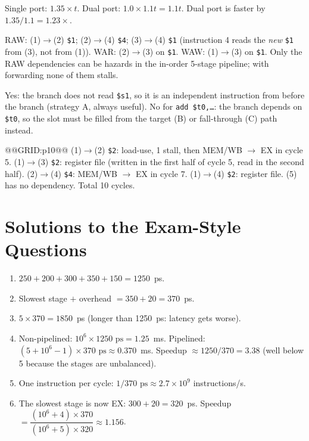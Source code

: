 \documentclass[11pt]{article}
\begin{document}
\begin{solution}[\ref{p:struct}]
Single port: $1.35\times t$. Dual port: $1.0\times1.1t = 1.1t$. Dual port is
faster by $1.35/1.1 = 1.23\times$.
\end{solution}

\begin{solution}[\ref{p:classify}]
RAW: (1)$\to$(2) \texttt{\$1}; (2)$\to$(4) \texttt{\$4}; (3)$\to$(4)
\texttt{\$1} (instruction 4 reads the \emph{new} \texttt{\$1} from (3), not
from (1)). WAR: (2)$\to$(3) on \texttt{\$1}. WAW: (1)$\to$(3) on
\texttt{\$1}. Only the RAW dependencies can be hazards in the in-order
5-stage pipeline; with forwarding none of them stalls.
\end{solution}

\begin{solution}[\ref{p:slot}]
Yes: the branch does not read \texttt{\$s1}, so it is an independent
instruction from before the branch (strategy A, always useful). No for
\texttt{add \$t0,\dots}: the branch depends on \texttt{\$t0}, so the slot
must be filled from the target (B) or fall-through (C) path instead.
\end{solution}

\begin{solution}[\ref{p:draw}]
@@GRID:p10@@
(1)$\to$(2) \texttt{\$2}: load-use, 1 stall, then MEM/WB $\to$ EX in
cycle 5. (1)$\to$(3) \texttt{\$2}: register file (written in the first half
of cycle 5, read in the second half). (2)$\to$(4) \texttt{\$4}: MEM/WB $\to$
EX in cycle 7. (1)$\to$(4) \texttt{\$2}: register file. (5) has no
dependency. Total 10 cycles.
\end{solution}

\section{Solutions to the Exam-Style Questions}

\begin{solution}[\ref{x:timing}]
\leavevmode
\begin{enumerate}[label=(\alph*),leftmargin=*]
  \item $250+200+300+350+150 = 1250$~ps.
  \item Slowest stage $+$ overhead $= 350+20 = 370$~ps.
  \item $5\times370 = 1850$~ps (longer than 1250~ps: latency gets worse).
  \item Non-pipelined: $10^6\times1250\text{ ps} = 1.25$~ms. Pipelined:
  $(5 + 10^6 - 1)\times370\text{ ps} \approx 0.370$~ms. Speedup $\approx
  1250/370 = 3.38$ (well below 5 because the stages are unbalanced).
  \item One instruction per cycle: $1/370\text{ ps} \approx 2.7\times10^9$
  instructions/s.
  \item The slowest stage is now EX: $300+20 = 320$~ps. Speedup $=
  \dfrac{(10^6+4)\times370}{(10^6+5)\times320} \approx 1.156$.
\end{enumerate}
\end{solution}
\end{document}
